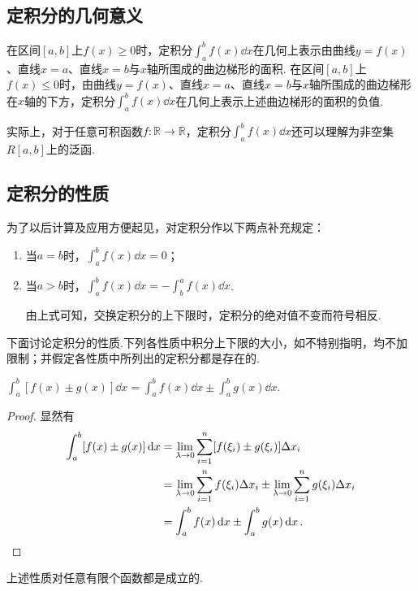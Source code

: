 \subsection{定积分的几何意义}
在区间\([a,b]\)上\(f(x) \geqslant 0\)时，定积分\(\int_a^b f(x) \dd{x}\)在几何上表示由曲线\(y=f(x)\)、直线\(x=a\)、直线\(x=b\)与\(x\)轴所围成的曲边梯形的面积.
在区间\([a,b]\)上\(f(x) \leqslant 0\)时，由曲线\(y=f(x)\)、直线\(x=a\)、直线\(x=b\)与\(x\)轴所围成的曲边梯形在\(x\)轴的下方，定积分\(\int_a^b f(x) \dd{x}\)在几何上表示上述曲边梯形的面积的负值.

实际上，对于任意可积函数\(f\colon \mathbb{R} \to \mathbb{R}\)，定积分\(\int_a^b f(x) \dd{x}\)还可以理解为非空集\(R[a,b]\)上的泛函.

\subsection{定积分的性质}
\begin{definition}
为了以后计算及应用方便起见，对定积分作以下两点补充规定：\begin{enumerate}
\item 当\(a=b\)时，\(\int_a^b f(x) \dd{x}=0\)；
\item 当\(a>b\)时，\(\int_a^b f(x) \dd{x}=-\int_b^a{f(x)\dd{x}}\).

由上式可知，交换定积分的上下限时，定积分的绝对值不变而符号相反.
\end{enumerate}
\end{definition}

下面讨论定积分的性质.下列各性质中积分上下限的大小，如不特别指明，均不加限制；并假定各性质中所列出的定积分都是存在的.
\begin{property}\label{theorem:定积分.定积分性质1}
\(\int_a^b [f(x) \pm g(x)] \dd{x}
= \int_a^b f(x) \dd{x} \pm \int_a^b g(x) \dd{x}\).
\begin{proof}
显然有\[
\begin{split}
\int_a^b [f(x) \pm g(x)] \dd{x}
&= \lim\limits_{\lambda\to0} \sum\limits_{i=1}^n [f(\xi_i) \pm g(\xi_i)] \Delta x_i \\
&= \lim\limits_{\lambda\to0} \sum\limits_{i=1}^n f(\xi_i) \Delta x_i
	\pm \lim\limits_{\lambda\to0} \sum\limits_{i=1}^n g(\xi_i) \Delta x_i \\
&= \int_a^b f(x) \dd{x} \pm \int_a^b g(x) \dd{x}.
\qedhere
\end{split}
\]
\end{proof}
\end{property}
上述性质对任意有限个函数都是成立的.

